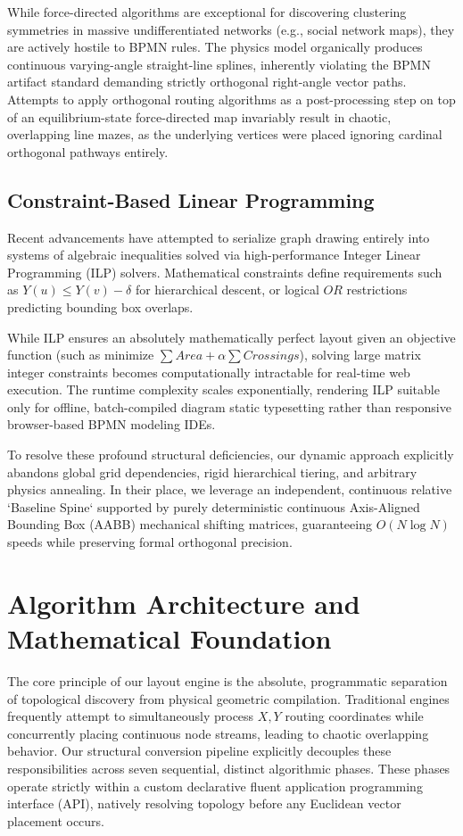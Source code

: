 \documentclass[fleqn,10pt]{wlscirep}
\begin{document}
While force-directed algorithms are exceptional for discovering clustering symmetries in massive undifferentiated networks (e.g., social network maps), they are actively hostile to BPMN rules. The physics model organically produces continuous varying-angle straight-line splines, inherently violating the BPMN artifact standard demanding strictly orthogonal right-angle vector paths. Attempts to apply orthogonal routing algorithms as a post-processing step on top of an equilibrium-state force-directed map invariably result in chaotic, overlapping line mazes, as the underlying vertices were placed ignoring cardinal orthogonal pathways entirely.

\subsection*{Constraint-Based Linear Programming}
Recent advancements have attempted to serialize graph drawing entirely into systems of algebraic inequalities solved via high-performance Integer Linear Programming (ILP) solvers. Mathematical constraints define requirements such as $Y(u) \le Y(v) - \delta$ for hierarchical descent, or logical $OR$ restrictions predicting bounding box overlaps. 

While ILP ensures an absolutely mathematically perfect layout given an objective function (such as minimize $\sum Area + \alpha \sum Crossings$), solving large matrix integer constraints becomes computationally intractable for real-time web execution. The runtime complexity scales exponentially, rendering ILP suitable only for offline, batch-compiled diagram static typesetting rather than responsive browser-based BPMN modeling IDEs.

To resolve these profound structural deficiencies, our dynamic approach explicitly abandons global grid dependencies, rigid hierarchical tiering, and arbitrary physics annealing. In their place, we leverage an independent, continuous relative `Baseline Spine` supported by purely deterministic continuous Axis-Aligned Bounding Box (AABB) mechanical shifting matrices, guaranteeing $O(N \log N)$ speeds while preserving formal orthogonal precision.

\section*{Algorithm Architecture and Mathematical Foundation}
The core principle of our layout engine is the absolute, programmatic separation of topological discovery from physical geometric compilation. Traditional engines frequently attempt to simultaneously process $X,Y$ routing coordinates while concurrently placing continuous node streams, leading to chaotic overlapping behavior. Our structural conversion pipeline explicitly decouples these responsibilities across seven sequential, distinct algorithmic phases. These phases operate strictly within a custom declarative fluent application programming interface (API), natively resolving topology before any Euclidean vector placement occurs.
\end{document}
